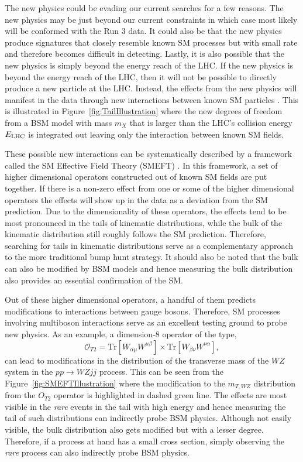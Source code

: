\documentclass[10pt]{article}
\begin{document}
The new physics could be evading our current searches for a few reasons.
The new physics may be just beyond our current constraints in which case most likely will be conformed with the Run 3 data.
It could also be that the new physics produce signatures that closely resemble known SM processes but with small rate and therefore becomes difficult in detecting.
Lastly, it is also possible that the new physics is simply beyond the energy reach of the LHC.
If the new physics is beyond the energy reach of the LHC, then it will not be possible to directly produce a new particle at the LHC.
Instead, the effects from the new physics will manifest in the data through new interactions between known SM particles \cite{}.
This is illustrated in Figure~\ref{fig:TailIllustration} where the new degrees of freedom from a BSM model with mass $m_{X}$ that is larger than the LHC's collision energy $E_{\tiny\textrm{LHC}}$ is integrated out leaving only the interaction between known SM fields.

These possible new interactions can be systematically described by a framework called the SM Effective Field Theory (SMEFT) \cite{}.
In this framework, a set of higher dimensional operators constructed out of known SM fields are put together.
If there is a non-zero effect from one or some of the higher dimensional operators the effects will show up in the data as a deviation from the SM prediction.
Due to the dimensionality of these operators, the effects tend to be most pronounced in the tails of kinematic distributions, while the bulk of the kinematic distribution still roughly follows the SM prediction.
Therefore, searching for tails in kinematic distributions serve as a complementary approach to the more traditional bump hunt strategy.
It should also be noted that the bulk can also be modified by BSM models and hence measuring the bulk distribution also provides an essential confirmation of the SM.

Out of these higher dimensional operators, a handful of them predicts modifications to interactions between gauge bosons.
Therefore, SM processes involving multiboson interactions serve as an excellent testing ground to probe new physics.
As an example, a dimension-8 operator of the type,
\begin{equation}
    \mathcal{O}_{T2} = \textrm{Tr}\left[W_{\alpha\mu}W^{\mu\beta}\right]\times\textrm{Tr}\left[W_{\beta\nu}W^{\nu\alpha}\right],
\end{equation}
can lead to modifications in the distribution of the transverse mass of the $WZ$ system in the $pp\to WZjj$ process.
This can be seen from the Figure~\ref{fig:SMEFTIllustration} where the modification to the $m_{T,WZ}$ distribution from the $O_{T2}$ operator is highlighted in dashed green line.
The effects are most visible in the \emph{rare} events in the tail with high energy and hence measuring the tail of such distributions can indirectly probe BSM physics.
Although not easily visible, the bulk distribution also gets modified but with a lesser degree.
Therefore, if a process at hand has a small cross section, simply observing the \emph{rare} process can also indirectly probe BSM physics.
\end{document}
